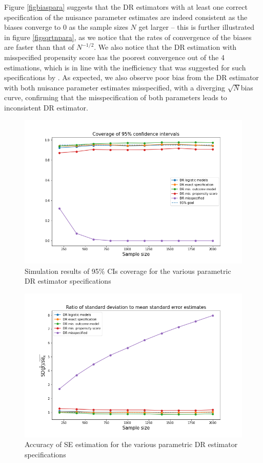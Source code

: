 \documentclass[12pt,twoside]{article}
\begin{document}
Figure \ref{figbiaspara} suggests that the DR estimators with at least one correct specification of the nuisance parameter estimates are indeed consistent as the biases converge to 0 as the sample sizes $N$ get larger -- this is further illustrated in figure \ref{figsqrtnpara}, as we notice that the rates of convergence of the biases are faster than that of $N^{-1/2}$. We also notice that the DR estimation with misspecified propensity score has the poorest convergence out of the 4 estimations, which is in line with the inefficiency that was suggested for such specifications by \citet{kang}. As expected, we also observe poor bias from the DR estimator with both nuisance parameter estimates misspecified, with a diverging $\sqrt{N}$bias curve, confirming that the misspecification of both parameters leads to inconsistent DR estimator.

\begin{figure}[h!]
    \centering
    \includegraphics[width = 0.9\columnwidth]{figures/CIpara.png}
    \caption{Simulation results of 95\% CIs coverage for the various parametric DR estimator specifications}
    \label{figCIpara}
\end{figure}

\begin{figure}[h!]
    \centering
    \includegraphics[width = 0.9\columnwidth]{figures/SEpara.png}
    \caption{Accuracy of \citet{lunceford_davidian} SE estimation for the various parametric DR estimator specifications}
    \label{figSEpara}
\end{figure}
\end{document}
